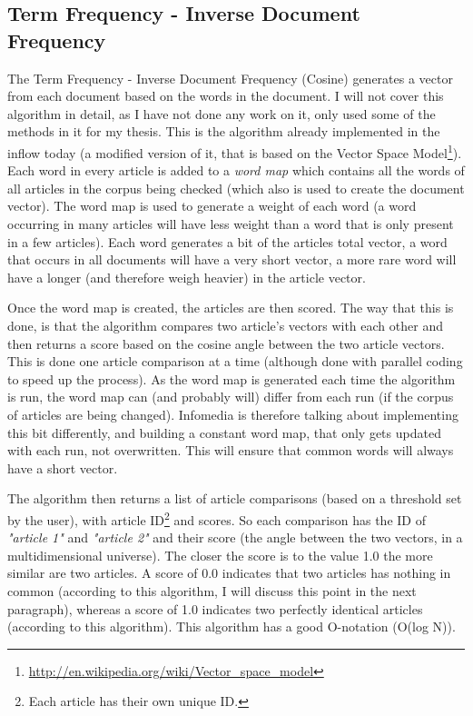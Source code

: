 \subsection{Term Frequency - Inverse Document Frequency} The Term Frequency - Inverse Document Frequency (Cosine) generates a vector from each document\cite{WikiTFIDF} based on the words in the document. I will not cover this algorithm in detail, as I have not done any work on it, only used some of the methods in it for my thesis. This is the algorithm already implemented in the inflow today (a modified version of it, that is based on the Vector Space Model\footnote{\url{http://en.wikipedia.org/wiki/Vector_space_model}}). Each word in every article is added to a \textit{word map} which contains all the words of all articles in the corpus being checked (which also is used to create the document vector). The word map is used to generate a weight of each word (a word occurring in many articles will have less weight than a word that is only present in a few articles). Each word generates a bit of the articles total vector, a word that occurs in all documents will have a very short vector, a more rare word will have a longer (and therefore weigh heavier) in the article vector.

Once the word map is created, the articles are then scored. The way that this is done, is that the algorithm compares two article's vectors with each other and then returns a score based on the cosine angle between the two article vectors. This is done one article comparison at a time (although done with parallel coding to speed up the process). As the word map is generated each time the algorithm is run, the word map can (and probably will) differ from each run (if the corpus of articles are being changed). Infomedia is therefore talking about implementing this bit differently, and building a constant word map, that only gets updated with each run, not overwritten. This will ensure that common words will always have a short vector.

The algorithm then returns a list of article comparisons (based on a threshold set by the user), with article ID\footnote{Each article has their own unique ID.} and scores. So each comparison has the ID of \textit{"article 1"} and \textit{"article 2"} and their score (the angle between the two vectors, in a multidimensional universe). The closer the score is to the value 1.0 the more similar are two articles. A score of 0.0 indicates that two articles has nothing in common (according to this algorithm, I will discuss this point in the next paragraph), whereas a score of 1.0 indicates two perfectly identical articles (according to this algorithm). This algorithm has a good O-notation (O(log N)).

